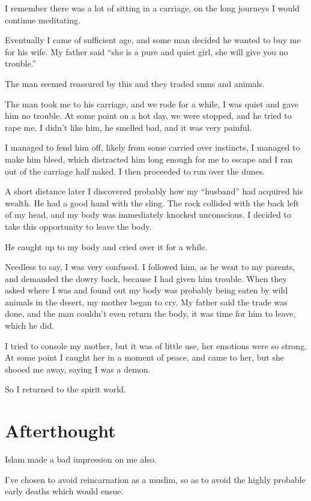I remember there was a lot of sitting in a carriage, on the long journeys I 
would continue meditating. 

Eventually I came of sufficient age, and some man decided he wanted to buy me
for his wife. My father said ``she is a pure and quiet girl, she will give you no
trouble.''

The man seemed reassured by this and they traded sums and animals.

The man took me to his carriage, and we rode for a while, I was quiet and gave
him no trouble. At some point on a hot day, we were stopped, and he tried to 
rape me. I didn't like him, he smelled bad, and it was very painful. 

I managed to fend him off, likely from some carried over instincts, I managed to
make him bleed, which distracted him long enough for me to escape and I ran out 
of the carriage half naked. I then proceeded to run over the dunes. 

A short distance later I discovered probably how my ``husband'' had acquired his
wealth. He had a good hand with the sling. The rock collided with the back left
of my head, and my body was immediately knocked unconscious. I decided to take
this opportunity to leave the body.

He caught up to my body and cried over it for a while.

Needless to say, I was very confused. I followed him, as he went to my parents,
and demanded the dowry back, because I had given him trouble. When they asked
where I was and found out my body was probably being eaten by wild animals in
the desert, my mother began to cry. My father said the trade was done, and the
man couldn't even return the body, it was time for him to leave, which he did.

I tried to console my mother, but it was of little use, her emotions were so
strong. At some point I caught her in a moment of peace, and came to her, but
she shooed me away, saying I was a demon.

So I returned to the spirit world.

\section{Afterthought}

Islam made a bad impression on me also. 

I've chosen to avoid reincarnation as a muslim, so as to avoid the highly
probable early deaths which would ensue. 

